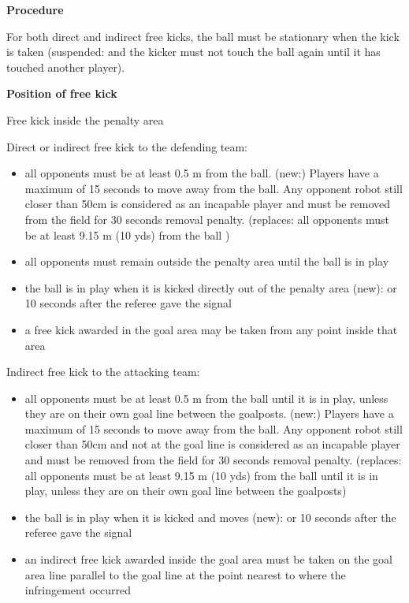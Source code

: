 {\bigskip

{\bfseries Procedure}

\headlinebox

For both direct and indirect free kicks, the ball must be stationary when the kick is taken 
\textcolor[rgb]{0.4,0.4,0.4}{(suspended: and the
kicker must not touch the ball again until it has touched another player)}.

\bigskip

{\bfseries Position of free kick }

\headlinebox

Free kick inside the penalty area

Direct or indirect free kick to the defending team:

\begin{itemize}
\item all opponents must be at least 0.5 m from the ball. (new:) Players have a maximum of 15 seconds to move away from the ball. Any opponent robot still closer than 50cm is considered as an incapable player and must be removed from the field for 30 seconds removal penalty.
\textcolor[rgb]{0.4,0.4,0.4}{(replaces: all opponents must be at least 9.15 m (10 yds) from the ball )}
\item all opponents must remain outside the penalty area until the ball is in play
\item the ball is in play when it is kicked directly out of the penalty area (new): or 10 seconds after the referee gave the signal
\item a free kick awarded in the goal area may be taken from any point inside that area
\end{itemize}

\bigskip

Indirect free kick to the attacking team:

\begin{itemize}
\item all opponents must be at least 0.5 m from the ball until it is in play, unless they are on their own goal line between the goalposts. (new:) Players have a maximum of 15 seconds to move away from the ball. Any opponent robot still closer than 50cm and not at the goal line is considered as an incapable player and must be removed from the field for 30 seconds removal penalty.
\textcolor[rgb]{0.4,0.4,0.4}{(replaces: all opponents must be at least 9.15 m (10 yds) from the ball until it is in play, unless they are on their own goal line between the goalposts)}
\item the ball is in play when it is kicked and moves (new): or 10 seconds after the referee gave the signal
\item an indirect free kick awarded inside the goal area must be taken on the goal area line parallel to the goal line at the point nearest to where the infringement occurred
\end{itemize}

}
